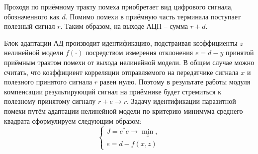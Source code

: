 Проходя по приёмному тракту помеха приобретает вид цифрового сигнала, обозначенного как $d$. Помимо помехи в приёмную часть терминала поступает полезный сигнал $r$. Таким образом, на выходе АЦП -- сумма $r+d$. 

Блок адаптации $АД$ производит идентификацию, подстраивая коэффициенты $z$ нелинейной модели $f(\cdot)$ посредством измерения отклонения $e=d-y$ принятой приёмным трактом помехи от выхода нелинейной модели. В общем случае можно считать, что коэффициент корреляции отправляемого на передатчике сигнала $x$ и полезного принятого сигнала $r$ равен нулю. Поэтому в результате работы модуля компенсации результирующий сигнал на приёмнике будет стремиться к полезному принятому сигналу $r+e\rightarrow r$. Задачу идентификации паразитной помехи путём адаптации нелинейной модели по критерию минимума среднего квадрата сформулируем следующим образом:
\begin{equation}
	\begin{cases}
		J = e^*e\rightarrow \displaystyle \min_{z},\\
		e = d-f(x, z) 
	\end{cases}
	\label{mse_sic}
\end{equation}
%
%
%

